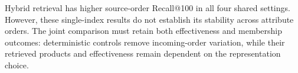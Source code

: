 Hybrid retrieval has higher source-order Recall@100 in all four shared settings. However, these single-index results do not establish its stability across attribute orders. The joint comparison must retain both effectiveness and membership outcomes: deterministic controls remove incoming-order variation, while their retrieved products and effectiveness remain dependent on the representation choice.
